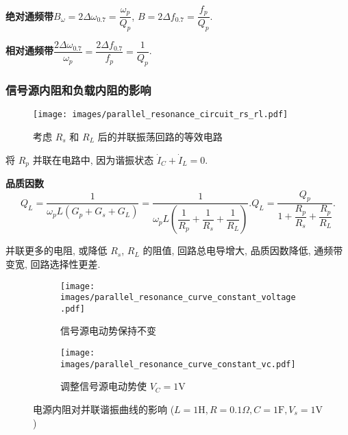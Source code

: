 \textbf{绝对通频带}\quad $B_\omega=2\Delta\omega_{0.7}=\dfrac{\omega_p}{Q_p}$, $B=2\Delta f_{0.7}=\dfrac{f_p}{Q_p}$.

\textbf{相对通频带}\quad $\dfrac{2\Delta\omega_{0.7}}{\omega_p}=\dfrac{2\Delta f_{0.7}}{f_p}=\dfrac{1}{Q_p}$.

\subsubsection{信号源内阻和负载内阻的影响}

\begin{figure}[H]
    \centering
    \texttt{[image: images/parallel\_resonance\_circuit\_rs\_rl.pdf]}
    \caption{考虑 $R_s$ 和 $R_L$ 后的并联振荡回路的等效电路}
    \label{fig:2.2 有载有内阻并联振荡回路}
\end{figure}

将 $R_p$ 并联在电路中, 因为谐振状态 $\dot{I}_C+\dot{I}_L=0$.

\textbf{品质因数}
\begin{subequations}
    \begin{equation}
        Q_L=\frac{1}{\omega_pL(G_p+G_s+G_L)}=\frac{1}{\omega_pL\left(\dfrac{1}{R_p}+\dfrac{1}{R_s}+\dfrac{1}{R_L}\right)}.
    \end{equation}
    \begin{equation}
        Q_L=\frac{Q_p}{1+\dfrac{R_p}{R_s}+\dfrac{R_p}{R_L}}.
    \end{equation}
\end{subequations}

并联更多的电阻, 或降低 $R_s$, $R_L$ 的阻值, 回路总电导增大, 品质因数降低, 通频带变宽, 回路选择性更差.

\begin{figure}[H]
    \centering
    \begin{subfigure}{.45\textwidth}
        \centering
        \texttt{[image: images/parallel\_resonance\_curve\_constant\_voltage.pdf]}
        \caption{信号源电动势保持不变}
    \end{subfigure}\qquad
    \begin{subfigure}{.45\textwidth}
        \centering
        \texttt{[image: images/parallel\_resonance\_curve\_constant\_vc.pdf]}
        \caption{调整信号源电动势使 $V_C=1\mathrm{V}$}
    \end{subfigure}
    \caption{电源内阻对并联谐振曲线的影响 ($L=1\mathrm{H},R=0.1\Omega,C=1\mathrm{F},V_s=1\mathrm{V}$)}
\end{figure}

